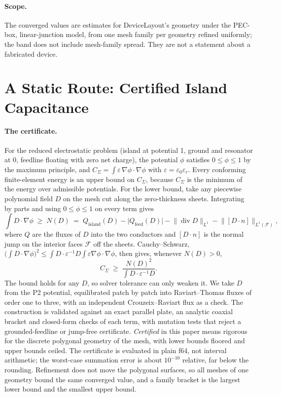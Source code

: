 \documentclass{anvil-paper}
\begin{document}
\paragraph{Scope.}
The converged values are estimates for DeviceLayout's geometry under the
PEC-box, linear-junction model, from one mesh family per geometry refined
uniformly; the band does not include mesh-family spread. They are not a
statement about a fabricated device.

\section{A Static Route: Certified Island Capacitance}
\label{sec:static}

\paragraph{The certificate.}
For the reduced electrostatic problem (island at potential 1, ground and
resonator at 0, feedline floating with zero net charge), the potential
$\phi$ satisfies $0 \le \phi \le 1$ by the maximum principle, and
$C_\Sigma = \int \varepsilon\,\nabla\phi\cdot\nabla\phi$ with $\varepsilon
= \varepsilon_0\varepsilon_r$. Every conforming finite-element energy is an
upper bound on $C_\Sigma$, because $C_\Sigma$ is the minimum of the energy
over admissible potentials. For the lower bound, take any piecewise
polynomial field $D$ on the mesh cut along the zero-thickness sheets.
Integrating by parts and using $0\le\phi\le1$ on every term gives
\begin{equation}
  \int D\cdot\nabla\phi \;\ge\; N(D) \;=\; Q_{\mathrm{island}}(D)
  - \lvert Q_{\mathrm{feed}}(D)\rvert
  - \lVert \operatorname{div} D\rVert_{L^1}
  - \lVert [D\cdot n]\rVert_{L^1(\mathcal F)},
  \label{eq:cert-n}
\end{equation}
where $Q$ are the fluxes of $D$ into the two conductors and
$[D\cdot n]$ is the normal jump on the interior faces $\mathcal F$ off
the sheets. Cauchy--Schwarz, $\bigl(\int D\cdot\nabla\phi\bigr)^2 \le
\int D\cdot\varepsilon^{-1}D \int\varepsilon\nabla\phi\cdot\nabla\phi$,
then gives, whenever $N(D) > 0$,
\begin{equation}
  C_\Sigma \;\ge\; \frac{N(D)^2}{\int D\cdot\varepsilon^{-1}D}.
  \label{eq:cert}
\end{equation}
The bound holds for any $D$, so solver tolerance can only weaken it. We
take $D$ from the P2 potential, equilibrated patch by patch into
Raviart--Thomas fluxes of order one to three, with an independent
Crouzeix--Raviart flux as a check. The construction is validated against
an exact parallel plate, an analytic coaxial bracket and closed-form
checks of each term, with mutation tests that reject a grounded-feedline
or jump-free certificate. \emph{Certified} in this paper means rigorous
for the discrete polygonal geometry of the mesh, with lower bounds
floored and upper bounds ceiled. The certificate is evaluated in plain
f64, not interval arithmetic; the worst-case summation error is about
$10^{-10}$ relative, far below the rounding. Refinement does not move the
polygonal surfaces, so all meshes of one geometry bound the same
converged value, and a family bracket is the largest lower bound and the
smallest upper bound.
\end{document}
